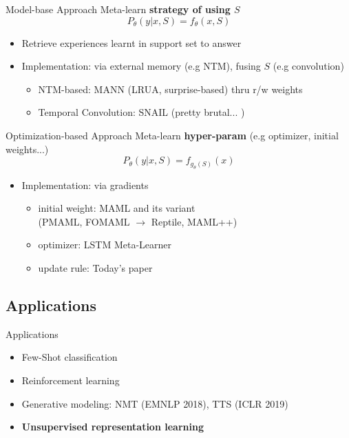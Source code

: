 \documentclass{beamer}
\begin{document}
\begin{frame}{Model-base Approach}
  Meta-learn \textbf{strategy of using $S$}
  \[ P_\theta(y|x,S) = f_\theta(x,S) \]
  \begin{itemize}
    \item Retrieve experiences learnt in support set to answer
    \item Implementation: via external memory (e.g NTM), fusing $S$ (e.g convolution)
    \begin{itemize}
      \item NTM-based: MANN (LRUA, surprise-based) thru r/w weights
      \item Temporal Convolution: SNAIL (pretty brutal... )
    \end{itemize}
\end{itemize}
\end{frame}

\begin{frame}{Optimization-based Approach}
  Meta-learn \textbf{hyper-param} (e.g optimizer, initial weights...)
  \[ P_\theta(y|x,S) = f_{g_\theta(S)}(x) \]
  \begin{itemize}
    \item Implementation: via gradients 
      \begin{itemize}
        \item initial weight: MAML and its variant\\
          (PMAML, FOMAML $\rightarrow$ Reptile, MAML++)
        \item optimizer: LSTM Meta-Learner
        \item update rule: Today's paper
      \end{itemize}
  \end{itemize}
\end{frame}

\subsection{Applications}

\begin{frame}{Applications}
  \begin{itemize}
    \item Few-Shot classification
    \item Reinforcement learning
    \item Generative modeling: NMT (EMNLP 2018), TTS (ICLR 2019)
    \item \textbf{Unsupervised representation learning}
  \end{itemize}
\end{frame}
\end{document}

